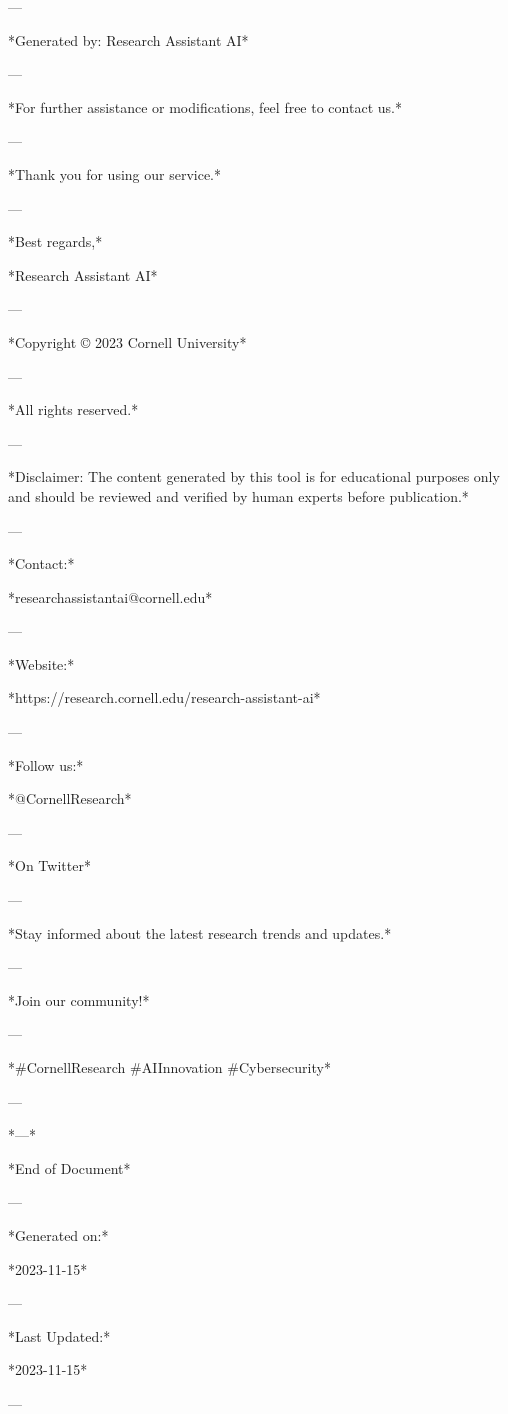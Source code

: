 --- 

*Generated by: Research Assistant AI* 

--- 

*For further assistance or modifications, feel free to contact us.* 

--- 

*Thank you for using our service.* 

--- 

*Best regards,* 

*Research Assistant AI* 

--- 

*Copyright © 2023 Cornell University* 

--- 

*All rights reserved.* 

--- 

*Disclaimer: The content generated by this tool is for educational purposes only and should be reviewed and verified by human experts before publication.* 

--- 

*Contact:* 

*researchassistantai@cornell.edu* 

--- 

*Website:* 

*https://research.cornell.edu/research-assistant-ai* 

--- 

*Follow us:* 

*@CornellResearch* 

--- 

*On Twitter* 

--- 

*Stay informed about the latest research trends and updates.* 

--- 

*Join our community!* 

--- 

*#CornellResearch #AIInnovation #Cybersecurity* 

--- 

*---* 

*End of Document* 

--- 

*Generated on:* 

*2023-11-15* 

--- 

*Last Updated:* 

*2023-11-15* 

--- 

